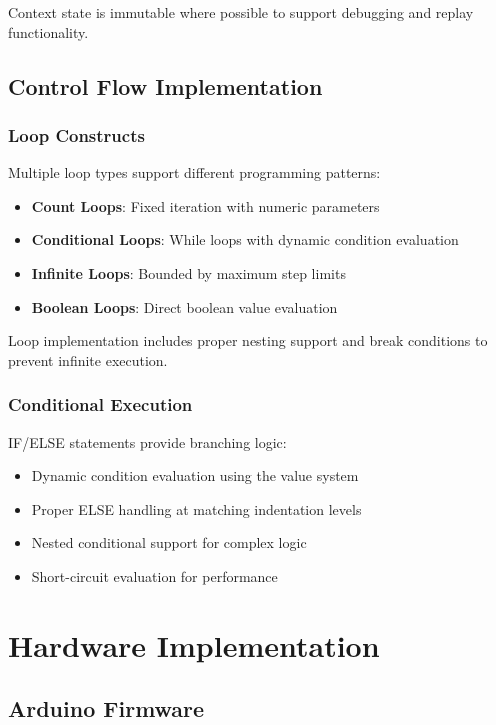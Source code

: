 Context state is immutable where possible to support debugging and replay functionality.

\subsection{Control Flow Implementation}

\subsubsection{Loop Constructs}

Multiple loop types support different programming patterns:

\begin{itemize}
    \item \textbf{Count Loops}: Fixed iteration with numeric parameters
    \item \textbf{Conditional Loops}: While loops with dynamic condition evaluation
    \item \textbf{Infinite Loops}: Bounded by maximum step limits
    \item \textbf{Boolean Loops}: Direct boolean value evaluation
\end{itemize}

Loop implementation includes proper nesting support and break conditions to prevent infinite execution.

\subsubsection{Conditional Execution}

IF/ELSE statements provide branching logic:

\begin{itemize}
    \item Dynamic condition evaluation using the value system
    \item Proper ELSE handling at matching indentation levels
    \item Nested conditional support for complex logic
    \item Short-circuit evaluation for performance
\end{itemize}

\section{Hardware Implementation}

\subsection{Arduino Firmware}

